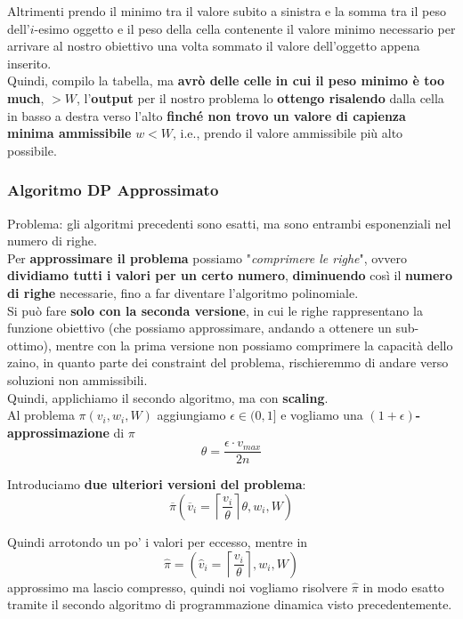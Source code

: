 Altrimenti prendo il minimo tra il valore subito a sinistra e la somma tra il peso dell'$i$-esimo oggetto e il peso della cella contenente il valore minimo necessario per arrivare al nostro obiettivo una volta sommato il valore dell'oggetto appena inserito.\\

Quindi, compilo la tabella, ma \textbf{avrò delle celle in cui il peso minimo è too much}, $> W$, l'\textbf{output} per il nostro problema lo \textbf{ottengo risalendo} dalla cella in basso a destra verso l'alto \textbf{finché non trovo un valore di capienza minima ammissibile} $w < W$, i.e., prendo il valore ammissibile più alto possibile.\\

\newpage

\subsubsection{Algoritmo DP Approssimato}

Problema: gli algoritmi precedenti sono esatti, ma sono entrambi esponenziali nel numero di righe.\\

Per \textbf{approssimare il problema} possiamo "\textit{comprimere le righe}", ovvero \textbf{dividiamo tutti i valori per un certo numero}, \textbf{diminuendo} così il \textbf{numero di righe} necessarie, fino a far diventare l'algoritmo polinomiale.\\

Si può fare \textbf{solo con la seconda versione}, in cui le righe rappresentano la funzione obiettivo (che possiamo approssimare, andando a ottenere un sub-ottimo), mentre con la prima versione non possiamo comprimere la capacità dello zaino, in quanto parte dei constraint del problema, rischieremmo di andare verso soluzioni non ammissibili.\\

Quindi, applichiamo il secondo algoritmo, ma con \textbf{scaling}.\\

Al problema $\pi (v_i, w_i, W)$ aggiungiamo $\epsilon \in (0,1]$ e vogliamo una \textbf{$(1+\epsilon)$-approssimazione} di $\pi$
$$ \theta = \frac{\epsilon \cdot v_{max}}{2n}$$

Introduciamo \textbf{due ulteriori versioni del problema}: 
$$ \overline{\pi} \left(\overline{v}_i = \left\lceil \frac{v_i}{\theta} \right\rceil \theta, w_i, W\right) $$

Quindi arrotondo un po' i valori per eccesso, mentre in 
$$ \hat \pi = \left( \hat v_i = \left\lceil \frac{v_i}{\theta} \right\rceil, w_i, W \right)$$
approssimo ma lascio compresso, quindi noi vogliamo risolvere $\hat \pi$ in modo esatto tramite il secondo algoritmo di programmazione dinamica visto precedentemente.\\

